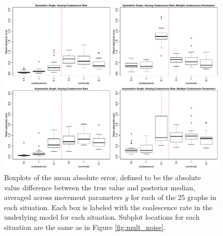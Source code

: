 \documentclass{article}
\begin{document}
\begin{figure}
\centering
\includegraphics[scale=.6]{figs/mult_gam}
\caption{
Boxplots of the mean absolute error, %
defined to be the absolute value difference between the true value and posterior median,
averaged across movement parameters $g$ for each of the 25 graphs in each situation.
Each box is labeled with the coalescence rate in the underlying model for each situation.
Subplot locations for each situation are the same as in Figure \ref{fig:mult_noise}.
}
\label{fig:mult_gam}
\end{figure}
\end{document}
